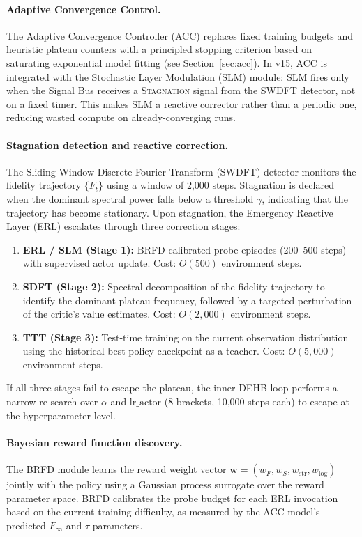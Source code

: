 \paragraph{Adaptive Convergence Control.}
The Adaptive Convergence Controller (ACC) replaces fixed training budgets and
heuristic plateau counters with a principled stopping criterion based on
saturating exponential model fitting (see Section~\ref{sec:acc}). In v15,
ACC is integrated with the Stochastic Layer Modulation (SLM) module: SLM
fires only when the Signal Bus receives a \textsc{Stagnation} signal from the
SWDFT detector, not on a fixed timer. This makes SLM a reactive corrector
rather than a periodic one, reducing wasted compute on already-converging runs.

\paragraph{Stagnation detection and reactive correction.}
The Sliding-Window Discrete Fourier Transform (SWDFT) detector monitors the
fidelity trajectory $\{F_t\}$ using a window of 2,000 steps. Stagnation is
declared when the dominant spectral power falls below a threshold $\gamma$,
indicating that the trajectory has become stationary. Upon stagnation, the
Emergency Reactive Layer (ERL) escalates through three correction stages:
\begin{enumerate}
  \item \textbf{ERL / SLM (Stage 1):} BRFD-calibrated probe episodes (200--500
    steps) with supervised actor update. Cost: $O(500)$ environment steps.
  \item \textbf{SDFT (Stage 2):} Spectral decomposition of the fidelity
    trajectory to identify the dominant plateau frequency, followed by a
    targeted perturbation of the critic's value estimates.
    Cost: $O(2{,}000)$ environment steps.
  \item \textbf{TTT (Stage 3):} Test-time training on the current observation
    distribution using the historical best policy checkpoint as a teacher.
    Cost: $O(5{,}000)$ environment steps.
\end{enumerate}
If all three stages fail to escape the plateau, the inner DEHB loop performs a
narrow re-search over $\alpha$ and $\mathrm{lr\_actor}$ (8 brackets, 10,000
steps each) to escape at the hyperparameter level.

\paragraph{Bayesian reward function discovery.}
The BRFD module learns the reward weight vector
$\mathbf{w} = (w_F, w_S, w_{\mathrm{str}}, w_{\log})$ jointly with the
policy using a Gaussian process surrogate over the reward parameter space.
BRFD calibrates the probe budget for each ERL invocation based on the
current training difficulty, as measured by the ACC model's predicted
$F_\infty$ and $\tau$ parameters.

